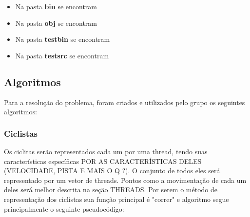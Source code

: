 \documentclass[12pt,a4paper]{article}
\begin{document}
\begin{itemize}
    \item Na pasta \textbf{bin} se encontram 
    
    \item Na pasta \textbf{obj} se encontram 
        
    \item Na pasta \textbf{testbin} se encontram 
    
    \item Na pasta \textbf{testsrc} se encontram 

    \end{itemize} %


\subsection{Algoritmos}

    Para a resolução do problema, foram criados e utilizados pelo grupo os seguintes algoritmos:
    
\subsubsection{Ciclistas}

    Os ciclitas serão representados cada um por uma thread, tendo suas características específicas POR AS CARACTERÍSTICAS DELES (VELOCIDADE, PISTA E MAIS O Q ?). O conjunto de todos eles será representado por um vetor de threads.
    Pontos como a movimentação de cada um deles será melhor descrita na seção THREADS.
    Por serem o método de representação dos ciclistas sua função principal é "correr" e algoritmo segue principalmente o seguinte pseudocódigo:
    
\end{document}
